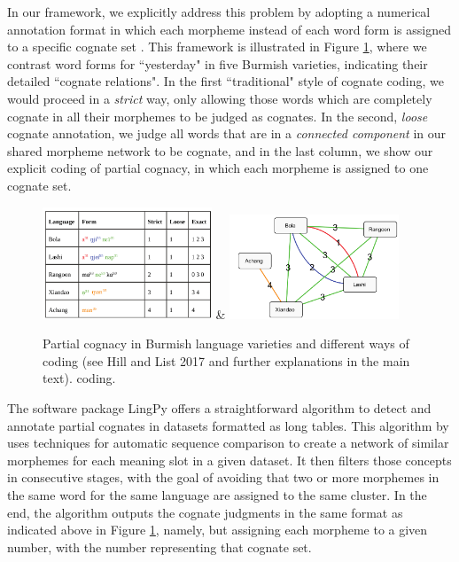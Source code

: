 \documentclass[xetex,svgnames]{scrartcl}
\begin{document}
In our framework, we explicitly address this problem by adopting a numerical annotation format in
which each morpheme instead of each word form is assigned to a specific cognate set
\citep{Hill2017a}. This framework is illustrated in Figure \ref{fig:pcogs}, where we contrast word
forms for ``yesterday" in five Burmish varieties, indicating their detailed ``cognate relations". 
In the first ``traditional" style of cognate coding, we would proceed in a \emph{strict} way, only
allowing those words which are completely cognate in all their morphemes to be judged as cognates.
In the second, \emph{loose} cognate annotation, we judge all words that are in a \emph{connected
component} in our shared morpheme network to be cognate, and in the last column, we show our
explicit coding of partial cognacy, in which each morpheme is assigned to one cognate set.

\begin{figure}[htb]
  \centering
  \includegraphics[width=0.45\textwidth]{pcogs-1.png} &
  \includegraphics[width=0.45\textwidth]{pcogs-2.png} \\\endtabular
  \caption{Partial cognacy in Burmish language varieties and different ways of coding (see Hill and
  List 2017 and further explanations in the main text).
  coding.}
  \label{fig:pcogs}
\end{figure}

The software package LingPy offers a straightforward algorithm to detect and annotate partial
cognates in datasets formatted as long tables. This algorithm by \citet{List2016g} uses techniques for automatic sequence
comparison to create a network of similar morphemes for each meaning slot in a given dataset. It
then filters those concepts in consecutive stages, with the goal of avoiding that two or more
morphemes in the same word for the same language are assigned to the same cluster. In the end, the
algorithm outputs the cognate judgments in the same format as indicated above in Figure
\ref{fig:pcogs}, namely, but assigning each morpheme to a given number, with the number representing
that cognate set.
\end{document}
